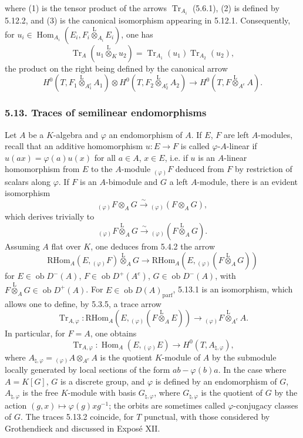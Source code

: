 \documentclass[11pt]{article}
\DeclareMathOperator{\Hom}{Hom}
\newcommand{\ob}{\operatorname{ob}}
\providecommand{\RHom}{\mathrm{RHom}}
\providecommand{\Tr}{\operatorname{Tr}}
\providecommand{\Tr}{\operatorname{Tr}}
\providecommand{\lten}{\overset{\mathrm L}{\otimes}}
\providecommand{\Tr}{\operatorname{Tr}}
\providecommand{\RHom}{\mathrm{RHom}}
\providecommand{\Hom}{\operatorname{Hom}}
\providecommand{\ob}{\operatorname{ob}}
\providecommand{\lten}{\overset{\mathrm L}{\otimes}}
\providecommand{\RHom}{\mathrm R\mathcal{H}om}
\providecommand{\lten}{\overset{\mathrm L}{\otimes}}
\providecommand{\Tr}{\operatorname{Tr}}
\providecommand{\lten}{\overset{\mathrm L}{\otimes}}
\providecommand{\lten}{\overset{\mathrm L}{\otimes}}
\providecommand{\lten}{\overset{\mathrm L}{\otimes}}
\providecommand{\RHom}{\mathrm{RHom}}
\begin{document}
where (1) is the tensor product of the arrows $\Tr_{A_i}$ (5.6.1), (2) is defined by 5.12.2, and (3) is the canonical isomorphism appearing in 5.12.1. Consequently, for $u_i\in\Hom_{A_i}(E_i,F_i\lten_{A_i}E_i)$, one has
\begin{equation}\tag{5.12.5}
\Tr_A(u_1\lten_Ku_2)=\Tr_{A_1}(u_1)\Tr_{A_2}(u_2),
\end{equation}
the product on the right being defined by the canonical arrow
\[
H^0(T,F_1\lten_{A_1^e}A_1)\otimes H^0(T,F_2\lten_{A_2^e}A_2)
\longrightarrow H^0(T,F\lten_{A^e}A).
\]

\subsubsection*{5.13. Traces of semilinear endomorphisms}

Let $A$ be a $K$-algebra and $\varphi$ an endomorphism of $A$. If $E$, $F$ are left $A$-modules, recall that an additive homomorphism $u:E\to F$ is called $\varphi$-$A$-linear if $u(ax)=\varphi(a)u(x)$ for all $a\in A$, $x\in E$, i.e. if $u$ is an $A$-linear homomorphism from $E$ to the $A$-module ${}_{(\varphi)}F$ deduced from $F$ by restriction of scalars along $\varphi$. If $F$ is an $A$-bimodule and $G$ a left $A$-module, there is an evident isomorphism
\[
{}_{(\varphi)}F\otimes_AG\xrightarrow{\sim}{}_{(\varphi)}(F\otimes_AG),
\]
which derives trivially to
\[
{}_{(\varphi)}F\lten_AG\xrightarrow{\sim}{}_{(\varphi)}(F\lten_AG).
\]
Assuming $A$ flat over $K$, one deduces from 5.4.2 the arrow
\begin{equation}\tag{5.13.1}
\RHom_A(E,{}_{(\varphi)}F)\lten_AG\longrightarrow\RHom_A(E,{}_{(\varphi)}(F\lten_AG))
\end{equation}
for $E\in\ob D^-(A)$, $F\in\ob D^+(A^e)$, $G\in\ob D^-(A)$, with $F\lten_AG\in\ob D^+(A)$. For $E\in\ob D(A)_{\mathrm{parf}}$, 5.13.1 is an isomorphism, which allows one to define, by 5.3.5, a trace arrow
\begin{equation}\tag{5.13.2}
\Tr_{A,\varphi}:\RHom_A(E,{}_{(\varphi)}(F\lten_AE))\longrightarrow {}_{(\varphi)}F\lten_{A^e}A.
\end{equation}
In particular, for $F=A$, one obtains
\begin{equation}\tag{5.13.3}
\Tr_{A,\varphi}:\Hom_A(E,{}_{(\varphi)}E)\longrightarrow H^0(T,A_{\natural,\varphi}),
\end{equation}
where $A_{\natural,\varphi}={}_{(\varphi)}A\otimes_{A^e}A$ is the quotient $K$-module of $A$ by the submodule locally generated by local sections of the form $ab-\varphi(b)a$. In the case where $A=K[G]$, $G$ is a discrete group, and $\varphi$ is defined by an endomorphism of $G$, $A_{\natural,\varphi}$ is the free $K$-module with basis $G_{\natural,\varphi}$, where $G_{\natural,\varphi}$ is the quotient of $G$ by the action $(g,x)\mapsto\varphi(g)xg^{-1}$; the orbits are sometimes called $\varphi$-conjugacy classes of $G$. The traces 5.13.2 coincide, for $T$ punctual, with those considered by Grothendieck and discussed in Exposé XII.
\end{document}
